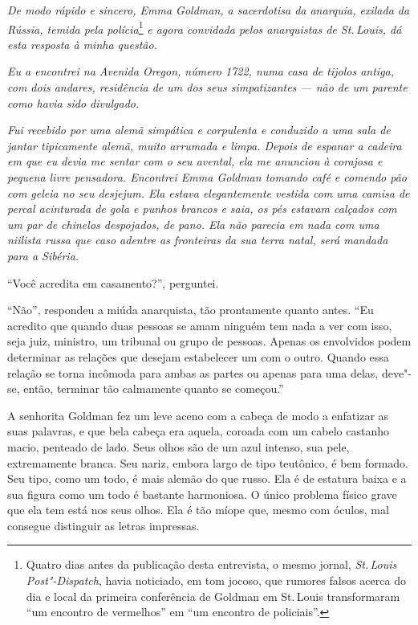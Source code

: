 \setlength{\epigraphwidth}{.65\textwidth}
\begin{epigraphs} 
\end{epigraphs} 

\noindent{}\textit{De modo rápido e sincero, Emma Goldman, a sacerdotisa da anarquia,
exilada da Rússia, temida pela polícia}\footnote{Quatro dias antes da publicação desta entrevista, o mesmo jornal, \textit{St.\,Louis Post"-Dispatch}, havia noticiado, em tom jocoso, que rumores falsos acerca do dia e local da primeira conferência de Goldman em St.\,Louis transformaram ``um encontro de vermelhos'' em ``um encontro de policiais''.} \textit{e agora convidada
pelos anarquistas de St.\,Louis, dá esta resposta à minha questão.}

\textit{Eu a encontrei na Avenida Oregon, número 1722, numa casa
de tijolos antiga, com dois andares, residência de um dos seus
simpatizantes --- não de um parente como havia sido divulgado.}

\textit{Fui recebido por uma alemã simpática e corpulenta e conduzido a uma sala de jantar tipicamente alemã, muito arrumada e limpa. Depois de espanar a
cadeira em que eu devia me sentar com o seu avental, ela me anunciou à
corajosa e pequena livre pensadora. Encontrei Emma Goldman tomando café
e comendo pão com geleia no seu desjejum. Ela estava elegantemente
vestida com uma camisa de percal acinturada de gola e punhos brancos e
saia, os pés estavam calçados com um par de chinelos despojados, de
pano. Ela não parecia em nada com uma niilista russa que caso adentre as
fronteiras da sua terra natal, será mandada para a Sibéria.}

\begin{center}\end{center}

``Você acredita em casamento?'', perguntei.

``Não'', respondeu a miúda anarquista, tão prontamente quanto antes.
``Eu acredito que quando duas pessoas se amam ninguém tem nada a ver com
isso, seja juiz, ministro, um tribunal ou grupo de pessoas.
Apenas os envolvidos podem determinar as relações que desejam estabelecer um com o
outro. Quando essa relação se torna incômoda para ambas as partes ou
apenas para uma delas, deve"-se, então, terminar tão calmamente quanto se
começou.''

A senhorita Goldman fez um leve aceno com a cabeça de modo a enfatizar
as suas palavras, e que bela cabeça era aquela, coroada com um cabelo
castanho macio, penteado de lado. Seus olhos são de um azul intenso,
sua pele, extremamente branca. Seu nariz, embora largo de tipo
teutônico, é bem formado. Seu tipo, como um todo, é mais alemão do que
russo. Ela é de estatura baixa e a sua figura como um todo é bastante harmoniosa.
O único problema físico grave que ela tem está nos seus olhos. Ela é tão míope que,
mesmo com óculos, mal consegue distinguir as letras impressas.

